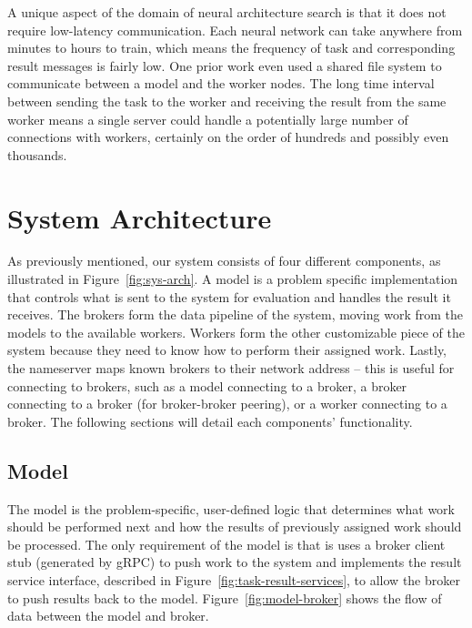\documentclass[conference]{IEEEtran}
\begin{document}
A unique aspect of the domain of neural architecture search is
that it does not require low-latency communication. Each neural network can take
anywhere from minutes to hours to train, which means the frequency of
task and corresponding result messages is fairly low. One prior work
\cite{DBLP:conf/icml/RealMSSSTLK17} even used a shared file system to communicate
between a model and the worker nodes. The long time interval between sending the
task to the worker and receiving the result from the same worker means a single
server could handle a potentially large number of connections with workers,
certainly on the order of hundreds and possibly even thousands.

\section{System Architecture}
As previously mentioned, our system consists of four different components, as
illustrated in Figure~\ref{fig:sys-arch}.  A model is a problem specific
implementation that controls what is sent to the system for evaluation and
handles the result it receives. The brokers form the data pipeline of the
system, moving work from the models to the available workers.  Workers form the
other customizable piece of the system because they need to know how to perform
their assigned work.  Lastly, the nameserver maps known brokers to their network
address -- this is useful for connecting to brokers, such as a model connecting
to a broker, a broker connecting to a broker (for broker-broker peering), or a
worker connecting to a broker. The following sections will detail each
components' functionality.


\subsection{Model}
The model is the problem-specific, user-defined logic that determines what work
should be performed next and how the results of previously assigned work should
be processed. The only requirement of the model is that is uses a broker client
stub (generated by gRPC) to push work to the system and implements the result
service interface, described in Figure~\ref{fig:task-result-services}, to allow
the broker to push results back to the model. Figure~\ref{fig:model-broker}
shows the flow of data between the model and broker.
\end{document}
